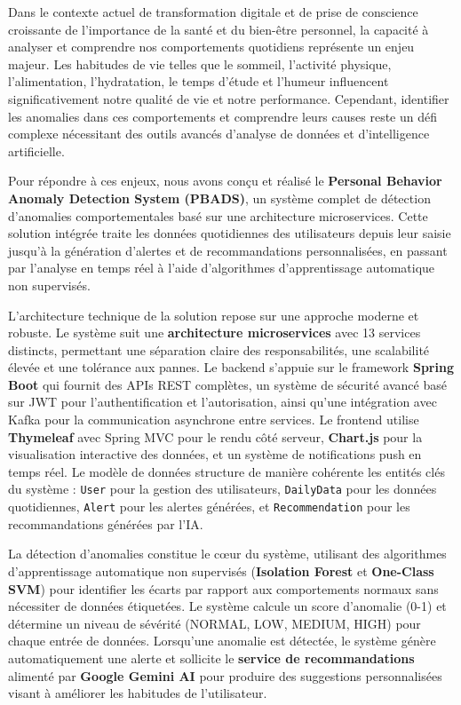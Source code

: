 Dans le contexte actuel de transformation digitale et de prise de conscience croissante de l'importance de la santé et du bien-être personnel, la capacité à analyser et comprendre nos comportements quotidiens représente un enjeu majeur. Les habitudes de vie telles que le sommeil, l'activité physique, l'alimentation, l'hydratation, le temps d'étude et l'humeur influencent significativement notre qualité de vie et notre performance. Cependant, identifier les anomalies dans ces comportements et comprendre leurs causes reste un défi complexe nécessitant des outils avancés d'analyse de données et d'intelligence artificielle.

Pour répondre à ces enjeux, nous avons conçu et réalisé le \textbf{Personal Behavior Anomaly Detection System (PBADS)}, un système complet de détection d'anomalies comportementales basé sur une architecture microservices. Cette solution intégrée traite les données quotidiennes des utilisateurs depuis leur saisie jusqu'à la génération d'alertes et de recommandations personnalisées, en passant par l'analyse en temps réel à l'aide d'algorithmes d'apprentissage automatique non supervisés.

L'architecture technique de la solution repose sur une approche moderne et robuste. Le système suit une \textbf{architecture microservices} avec 13 services distincts, permettant une séparation claire des responsabilités, une scalabilité élevée et une tolérance aux pannes. Le backend s'appuie sur le framework \textbf{Spring Boot} qui fournit des APIs REST complètes, un système de sécurité avancé basé sur JWT pour l'authentification et l'autorisation, ainsi qu'une intégration avec Kafka pour la communication asynchrone entre services. Le frontend utilise \textbf{Thymeleaf} avec Spring MVC pour le rendu côté serveur, \textbf{Chart.js} pour la visualisation interactive des données, et un système de notifications push en temps réel. Le modèle de données structure de manière cohérente les entités clés du système : \texttt{User} pour la gestion des utilisateurs, \texttt{DailyData} pour les données quotidiennes, \texttt{Alert} pour les alertes générées, et \texttt{Recommendation} pour les recommandations générées par l'IA.

La détection d'anomalies constitue le cœur du système, utilisant des algorithmes d'apprentissage automatique non supervisés (\textbf{Isolation Forest} et \textbf{One-Class SVM}) pour identifier les écarts par rapport aux comportements normaux sans nécessiter de données étiquetées. Le système calcule un score d'anomalie (0-1) et détermine un niveau de sévérité (NORMAL, LOW, MEDIUM, HIGH) pour chaque entrée de données. Lorsqu'une anomalie est détectée, le système génère automatiquement une alerte et sollicite le \textbf{service de recommandations} alimenté par \textbf{Google Gemini AI} pour produire des suggestions personnalisées visant à améliorer les habitudes de l'utilisateur.

